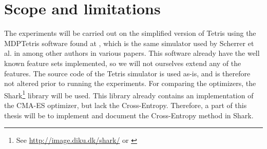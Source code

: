 \section{Scope and limitations \label{section:scope}}


The experiments will be carried out on the simplified version of
Tetris using the MDPTetris software found at \cite{mdptetris},
which is the same simulator used by Scherrer et al. in \cite{scherrer2009:b} among 
other authors in various papers.
This software already have the well known feature sets
implemented, so we will not ourselves extend any of the features.
The source code of the Tetris simulator is used as-is, and is therefore 
not altered prior to running the experiments. 
For comparing the optimizers, the Shark\footnote{See \url{http://image.diku.dk/shark/} or \cite{shark08}
} library will be used. This library already contains an
implementation of the CMA-ES optimizer, but lack the 
Cross-Entropy. Therefore, a part of this thesis will
be to implement and document the Cross-Entropy method in Shark.




